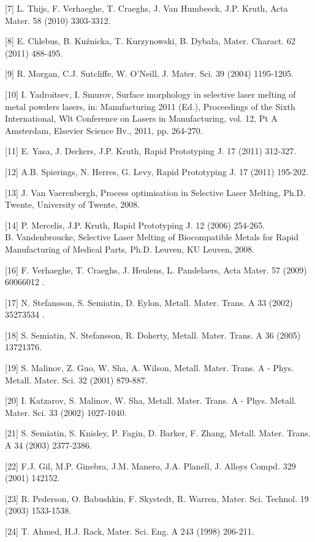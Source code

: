 \documentclass[10pt]{article}
\begin{document}
[7] L. Thijs, F. Verhaeghe, T. Craeghs, J. Van Humbeeck, J.P. Kruth, Acta Mater. 58 (2010) 3303-3312.

[8] E. Chlebus, B. Kuźnicka, T. Kurzynowski, B. Dybała, Mater. Charact. 62 (2011) 488-495.

[9] R. Morgan, C.J. Sutcliffe, W. O’Neill, J. Mater. Sci. 39 (2004) 1195-1205.

[10] I. Yadroitsev, I. Smurov, Surface morphology in selective laser melting of metal powders lasers, in: Manufacturing 2011 (Ed.), Proceedings of the Sixth International, Wlt Conference on Lasers in Manufacturing, vol. 12, Pt A Amsterdam, Elsevier Science Bv., 2011, pp. 264-270.

[11] E. Yasa, J. Deckers, J.P. Kruth, Rapid Prototyping J. 17 (2011) 312-327.

[12] A.B. Spierings, N. Herres, G. Levy, Rapid Prototyping J. 17 (2011) 195-202.

[13] J. Van Vaerenbergh, Process optimisation in Selective Laser Melting, Ph.D. Twente, University of Twente, 2008.

[14] P. Mercelis, J.P. Kruth, Rapid Prototyping J. 12 (2006) 254-265.\\
[15] B. Vandenbroucke, Selective Laser Melting of Biocompatible Metals for Rapid Manufacturing of Medical Parts, Ph.D. Leuven, KU Leuven, 2008.

[16] F. Verhaeghe, T. Craeghs, J. Heulens, L. Pandelaers, Acta Mater. 57 (2009) 60066012 .

[17] N. Stefansson, S. Semiatin, D. Eylon, Metall. Mater. Trans. A 33 (2002) 35273534 .

[18] S. Semiatin, N. Stefansson, R. Doherty, Metall. Mater. Trans. A 36 (2005) 13721376.

[19] S. Malinov, Z. Guo, W. Sha, A. Wilson, Metall. Mater. Trans. A - Phys. Metall. Mater. Sci. 32 (2001) 879-887.

[20] I. Katzarov, S. Malinov, W. Sha, Metall. Mater. Trans. A - Phys. Metall. Mater. Sci. 33 (2002) 1027-1040.

[21] S. Semiatin, S. Knisley, P. Fagin, D. Barker, F. Zhang, Metall. Mater. Trans. A 34 (2003) 2377-2386.

[22] F.J. Gil, M.P. Ginebra, J.M. Manero, J.A. Planell, J. Alloys Compd. 329 (2001) 142152.

[23] R. Pederson, O. Babushkin, F. Skystedt, R. Warren, Mater. Sci. Technol. 19 (2003) 1533-1538.

[24] T. Ahmed, H.J. Rack, Mater. Sci. Eng. A 243 (1998) 206-211.
\end{document}
